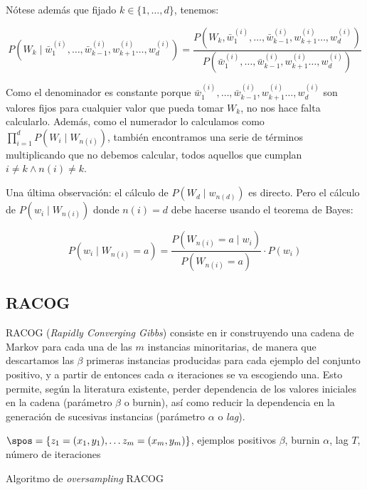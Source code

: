 

Nótese además que fijado $k\in \{1, \ldots, d\}$, tenemos: 

\[P(W_k \mid \bar{w}_1^{(i)}, \ldots, \bar{w}_{k-1}^{(i)}, w_{k+1}^{(i)} \ldots, w_{d}^{(i)}) = 
 \frac{P(W_k, \bar{w}_1^{(i)}, \ldots, \bar{w}_{k-1}^{(i)}, w_{k+1}^{(i)} \ldots, w_{d}^{(i)})}
      {P(\bar{w}_1^{(i)}, \ldots, \bar{w}_{k-1}^{(i)}, w_{k+1}^{(i)} \ldots, w_{d}^{(i)})}
\]

Como el denominador es constante porque $\bar{w}_1^{(i)}, \ldots, \bar{w}_{k-1}^{(i)}, w_{k+1}^{(i)} \ldots, w_{d}^{(i)}$
son valores fijos para cualquier valor que pueda tomar $W_k$, no nos hace falta calcularlo. Además, como el
numerador lo calculamos como $\prod_{i=1}^d P(W_i \mid W_{n(i)})$, también encontramos una serie de términos 
multiplicando que no debemos calcular, todos aquellos que cumplan $i\neq k \wedge n(i) \neq k$.

Una última observación: el cálculo de $P(W_d \mid w_{n(d)})$ es directo. Pero el cálculo de 
$P(w_i \mid W_{n(i)})$ donde $n(i) = d$ debe hacerse usando el teorema de Bayes:

\[P(w_i \mid W_{n(i)} = a) = \frac{P(W_{n(i)} = a \mid w_i)}{P(W_{n(i)} = a)} \cdot P(w_i)\] 

\subsection{RACOG}
RACOG (\textit{Rapidly Converging Gibbs}) consiste en ir construyendo una cadena de Markov para cada una de 
las $m$ instancias minoritarias, de manera que descartamos las $\beta$ primeras instancias producidas para 
cada ejemplo del conjunto positivo, y a partir de entonces cada $\alpha$ iteraciones se va escogiendo una. 
Esto permite, según la literatura existente, perder dependencia de los valores iniciales en la cadena 
(parámetro $\beta$ o burnin), así como reducir la dependencia en la generación de sucesivas instancias 
(parámetro $\alpha$ o \textit{lag}).

\begin{algorithm}[H]
\begin{algorithmic}[1]
  \REQUIRE $\spos = \{z_1=(x_1, y_1), \ldots z_m=(x_m, y_m)\}$, ejemplos positivos
  \REQUIRE $\beta$, burnin
  \REQUIRE $\alpha$, lag
  \REQUIRE $T$, número de iteraciones
  \NEWLINE
    \NEWLINE
    \ENDIF
  \ENDFOR
  \NEWLINE
\end{algorithmic}
\caption{Algoritmo de \textit{oversampling} RACOG}
\label{alg:racog}
\end{algorithm}

